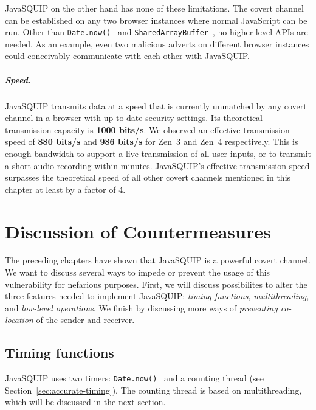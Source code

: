\documentclass[11pt,
  titlepage=false,
  parskip=half,      %
]{scrreprt}
\begin{document}
JavaSQUIP on the other hand has none of these limitations.
The covert channel can be established on any two browser instances where normal JavaScript can be run.
Other than \texttt{Date.now()}~\cite{datenow} and \texttt{SharedArrayBuffer}~\cite{sharedarraybuffer},
no higher-level APIs are needed.
As an example, even two malicious adverts on different browser instances could conceivably communicate with each other
with JavaSQUIP.

\paragraph{Speed.}
JavaSQUIP transmits data at a speed that is currently unmatched by any covert channel in a browser with up-to-date security settings.
Its theoretical transmission capacity is \textbf{1000 bits/s}.
We observed an effective transmission speed of \textbf{880 bits/s} and \textbf{986 bits/s} for Zen~3 and Zen~4 respectively.
This is enough bandwidth to support a live transmission of all user inputs, or to transmit a short audio recording within minutes.
JavaSQUIP's effective transmission speed surpasses the theoretical speed of all other covert channels mentioned in this chapter at least by a factor of 4.

\chapter{Discussion of Countermeasures}
\label{ch:countermeasures}

The preceding chapters have shown that JavaSQUIP is a powerful covert channel.
We want to discuss several ways to impede or prevent the usage of this vulnerability for nefarious purposes.
First, we will discuss possibilites to alter the three features needed to implement JavaSQUIP:
\textit{timing functions}, \textit{multithreading}, and \textit{low-level operations}.
We finish by discussing more ways of \textit{preventing co-location} of the sender and receiver.

\section{Timing functions}
JavaSQUIP uses two timers: \texttt{Date.now()}~\cite{datenow} and a counting thread (see Section~\ref{sec:accurate-timing}).
The counting thread is based on multithreading, which will be discussed in the next section.
\end{document}
